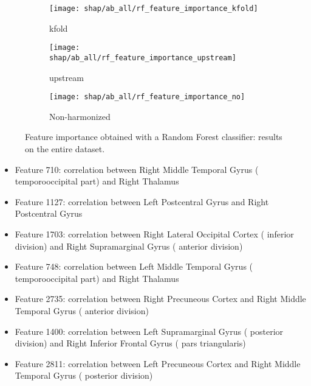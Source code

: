\documentclass[11pt]{report}
\begin{document}
\begin{figure}
\centering
\begin{subfigure}[b]{.45\textwidth}
   \texttt{[image: shap/ab\_all/rf\_feature\_importance\_kfold]}
   \caption{kfold}
   \label{}
\end{subfigure}
\begin{subfigure}[b]{.45\textwidth}
   \texttt{[image: shap/ab\_all/rf\_feature\_importance\_upstream]}
   \caption{upstream}
   \label{}
\end{subfigure}
\begin{subfigure}[b]{.45\textwidth}
   \texttt{[image: shap/ab\_all/rf\_feature\_importance\_no]}
   \caption{Non-harmonized}
   \label{}
\end{subfigure}
\caption{Feature importance obtained with a Random Forest classifier: results on the entire dataset.}
\label{fig:shap_abide_rf_all}
\end{figure}



\begin{itemize}
\item Feature 710: correlation between Right Middle Temporal Gyrus ( temporooccipital part) and Right Thalamus
\item Feature 1127: correlation between Left Postcentral Gyrus  and Right Postcentral Gyrus
\item Feature 1703: correlation between Right Lateral Occipital Cortex ( inferior division) and Right Supramarginal Gyrus ( anterior division)
\item Feature 748: correlation between Left Middle Temporal Gyrus ( temporooccipital part) and Right Thalamus
\item Feature 2735: correlation between Right Precuneous Cortex  and Right Middle Temporal Gyrus ( anterior division)
\item Feature 1400: correlation between Left Supramarginal Gyrus ( posterior division) and Right Inferior Frontal Gyrus ( pars triangularis)
\item Feature 2811: correlation between Left Precuneous Cortex  and Right Middle Temporal Gyrus ( posterior division)
\end{itemize}
\end{document}
